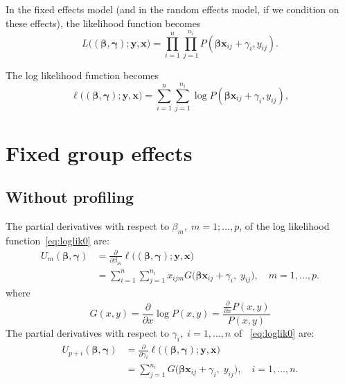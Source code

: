 \documentclass[a4paper,11pt]{article}
\newcommand{\bx}{\ensuremath{\mathbf{x}}}
\newcommand{\by}{\ensuremath{\mathbf{y}}}
\newcommand{\bb}{\ensuremath{\boldsymbol{\beta}}}
\newcommand{\bg}{\ensuremath{\boldsymbol{\gamma}}}
\newcommand{\pyg}{\ensuremath{P(\bb\bx_{ij} + \gamma_i, y_{ij})}}
\newcommand{\gGy}{\ensuremath{G\big(\bb\bx_{ij} + \gamma_i, \;
    y_{ij}\big)}}
\begin{document}
In the fixed effects model (and in the random effects model, if we
condition on these effects), the likelihood function becomes
\begin{equation}\label{eq:lik0}
L\big((\bb, \bg); \by, \bx\big) = \prod_{i = 1}^n
\prod_{j = 1}^{n_i} \pyg.
\end{equation}
 
The log likelihood function becomes
\begin{equation}\label{eq:loglik0}
\ell\big((\bb, \bg); \by, \bx\big) 
= \sum_{i = 1}^n \sum_{j=1}^{n_i}\log \pyg ,
\end{equation}

\section{Fixed group effects}

\subsection{Without profiling}

The partial derivatives with respect to $\beta_m, \; m = 1; \ldots, p$, of the log
likelihood function~\eqref{eq:loglik0} are: 
\begin{equation}\label{eq:parb3}
\begin{split}
U_m(\bb, \bg) &= 
\frac{\partial}{\partial \beta_m} 
\ell\big((\bb, \bg); \by, \bx\big)\\
&=
\sum_{i=1}^n \sum_{j=1}^{n_i} x_{ijm}\gGy, \quad m = 1, \ldots, p. 
\end{split}
\end{equation}
where
\begin{equation*}
G(x, y) = \frac{\partial}{\partial x} \log P(x, y) = \frac{
\frac{\partial}{\partial x}P(x, y)}{P(x, y)}
\end{equation*}
The partial derivatives with respect to $\gamma_i, \;i  = 1, \ldots, n$ of
~\eqref{eq:loglik0} are:
\begin{equation}\label{eq:paro2}
\begin{split}
U_{p + i}(\bb, \bg) &= 
\frac{\partial}{\partial \gamma_i} 
\ell\big((\bb, \bg); \by, \bx\big)\\
&=
\sum_{j=1}^{n_i} \gGy, \quad i = 1, \ldots, n.
\end{split}
\end{equation}
\end{document}

